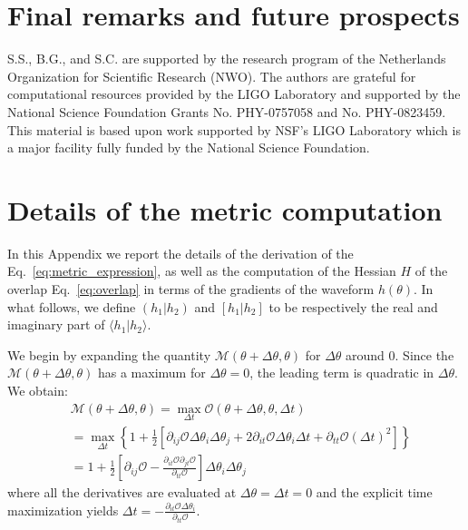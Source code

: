 \documentclass[twocolumn,showpacs,preprintnumbers,nofootinbib,prd,
superscriptaddress,10pt]{revtex4-2}
\newcommand{\scalar}[2]{\langle #1|#2 \rangle}
\newcommand{\rescalar}[2]{( #1 |#2 )}
\newcommand{\imscalar}[2]{[ #1|#2 ]}
\begin{document}
\section{Final remarks and future prospects} \label{sec:conclusion}


        \begin{acknowledgments}
		S.S., B.G., and S.C. are supported by the research program of the Netherlands Organization for Scientific Research (NWO).
		The authors are grateful for computational resources provided by the LIGO Laboratory and supported by the National Science Foundation Grants No. PHY-0757058 and No. PHY-0823459. This material is based upon work supported by NSF’s LIGO Laboratory which is a major facility fully funded by the National Science Foundation.
        \end{acknowledgments}

\appendix

\section{Details of the metric computation}\label{app:metric}

In this Appendix we report the details of the derivation of the Eq.~\eqref{eq:metric_expression}, as well as the computation of the Hessian $H$ of the overlap Eq.~\eqref{eq:overlap} in terms of the gradients of the waveform $h(\theta)$. 
In what follows, we define $\rescalar{h_1}{h_2}$ and $\imscalar{h_1}{h_2}$ to be respectively the real and imaginary part of $\scalar{h_1}{h_2}$.

We begin by expanding the quantity $\mathcal{M}(\theta+\Delta\theta,\theta )$ for $\Delta\theta$ around $0$. Since the $\mathcal{M}(\theta+\Delta\theta,\theta )$ has a maximum for $\Delta\theta = 0$, the leading term is quadratic in $\Delta\theta$.
We obtain:
\begin{align} \label{eq:metric_derivation}
	&\mathcal{M}(\theta+\Delta\theta,\theta ) = \max_{\Delta t} \mathcal{O}(\theta + \Delta\theta, \theta, \Delta t) \nonumber\\
	& =	\max_{\Delta t} \left\{ 1+ \frac{1}{2}\left[ \partial_{ij}\mathcal{O} \Delta\theta_i \Delta\theta_j + 2  \partial_{it}\mathcal{O} \Delta\theta_i \Delta t + \partial_{tt}\mathcal{O} (\Delta t)^2 \right] \right\}  \nonumber \\
	&= 1 + \frac{1}{2}\left[ \partial_{ij}\mathcal{O} - \frac{\partial_{it}\mathcal{O} \partial_{jt}\mathcal{O}}{\partial_{tt}\mathcal{O}}\right] \Delta\theta_i \Delta\theta_j
\end{align}
where all the derivatives are evaluated at ${\Delta\theta = \Delta t = 0}$ and the explicit time maximization yields
${\Delta t = -\frac{\partial_{it}\mathcal{O} \Delta\theta_i}{\partial_{tt}\mathcal{O}}}$.
\end{document}
